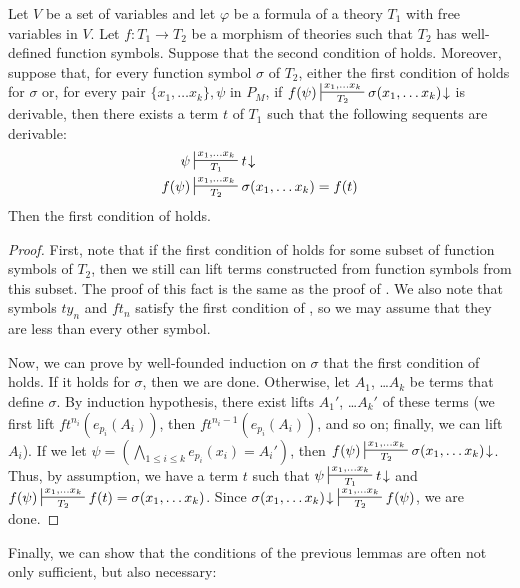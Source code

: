 \documentclass[reqno]{amsart}
\theoremstyle{definition}
\theoremstyle{remark}
\numberwithin{figure}{section}
\begin{document}
\begin{lem}
Let $V$ be a set of variables and let $\varphi$ be a formula of a theory $T_1$ with free variables in $V$.
Let $f : T_1 \to T_2$ be a morphism of theories such that $T_2$ has well-defined function symbols.
Suppose that the second condition of  holds.
Moreover, suppose that, for every function symbol $\sigma$ of $T_2$, either the first condition of  holds for $\sigma$ or,
for every pair $\{ x_1, \ldots x_k \},\psi$ in $P_M$, if $f(\psi) \sststile{T_2}{x_1, \ldots x_k} \sigma(x_1, \ldots x_k)\!\downarrow$ is derivable, then there exists a term $t$ of $T_1$ such that the following sequents are derivable:
\begin{align*}
\psi & \sststile{T_1}{x_1, \ldots x_k} t\!\downarrow \\
f(\psi) & \sststile{T_2}{x_1, \ldots x_k} \sigma(x_1, \ldots x_k) = f(t)
\end{align*}
Then the first condition of  holds.
\end{lem}
\begin{proof}
First, note that if the first condition of  holds for some subset of function symbols of $T_2$, then we still can lift terms constructed from function symbols from this subset.
The proof of this fact is the same as the proof of .
We also note that symbols $ty_n$ and $ft_n$ satisfy the first condition of , so we may assume that they are less than every other symbol.

Now, we can prove by well-founded induction on $\sigma$ that the first condition of  holds.
If it holds for $\sigma$, then we are done.
Otherwise, let $A_1$, \ldots $A_k$ be terms that define $\sigma$.
By induction hypothesis, there exist lifts $A_1'$, \ldots $A_k'$ of these terms (we first lift $ft^{n_i}(e_{p_i}(A_i))$, then $ft^{n_i-1}(e_{p_i}(A_i))$, and so on; finally, we can lift $A_i$).
If we let $\psi = (\bigwedge_{1 \leq i \leq k} e_{p_i}(x_i) = A_i')$, then $f(\psi) \sststile{T_2}{x_1, \ldots x_k} \sigma(x_1, \ldots x_k)\!\downarrow$.
Thus, by assumption, we have a term $t$ such that $\psi \sststile{T_1}{x_1, \ldots x_k} t\!\downarrow$ and $f(\psi) \sststile{T_2}{x_1, \ldots x_k} f(t) = \sigma(x_1, \ldots x_k)$.
Since $\sigma(x_1, \ldots x_k)\!\downarrow\ \sststile{T_2}{x_1, \ldots x_k} f(\psi)$, we are done.
\end{proof}

Finally, we can show that the conditions of the previous lemmas are often not only sufficient, but also necessary:
\end{document}
